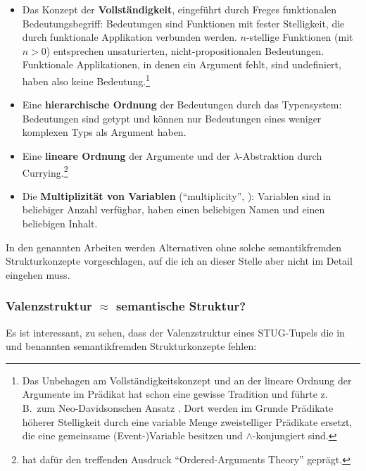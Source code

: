{\begin{itemize}
  \item Das Konzept der {\bf Vollständigkeit}, eingeführt durch Freges funktionalen Bedeutungsbegriff: Bedeutungen sind Funktionen mit fester Stelligkeit, die durch funktionale Applikation verbunden werden. $n$-stellige Funktionen (mit $n > 0$) entsprechen unsaturierten, nicht-propositionalen Bedeutungen. Funktionale Applikationen, in denen ein Argument fehlt, sind undefiniert, haben also keine Bedeutung.\footnote{Das Unbehagen am Vollständigkeitskonzept und an der lineare Ordnung der Argumente im Prädikat hat schon eine gewisse Tradition und führte z.\,B.\ zum Neo-Davidsonschen Ansatz \citep{Parsons:90,Parsons:95}. Dort werden im Grunde Prädikate höherer Stelligkeit durch eine variable Menge zweistelliger Prädikate ersetzt, die eine gemeinsame (Event-)Variable besitzen und $\wedge$-konjungiert sind.}
  \item Eine {\bf hierarchische Ordnung} der Bedeutungen durch das Typensystem: Bedeutungen sind getypt und können nur Bedeutungen eines weniger komplexen Typs als Argument haben.  
  \item Eine {\bf lineare Ordnung} der Argumente und der $\lambda$-Abstraktion durch Currying.\footnote{\cite{Dowty:89} hat dafür den treffenden Ausdruck "`Ordered-Arguments Theory"' geprägt.}
  \item Die {\bf Multiplizität von Variablen} ("`multiplicity"', \citealt{Kracht:07,Kracht:11}): Variablen sind in beliebiger Anzahl verfügbar, haben einen beliebigen Namen und einen beliebigen Inhalt.
\end{itemize}
In den genannten Arbeiten werden Alternativen ohne solche semantikfremden Strukturkonzepte vorgeschlagen, auf die ich an dieser Stelle aber nicht im Detail eingehen muss. 

\subsubsection*{Valenzstruktur $\approx$ semantische Struktur?} 

Es ist interessant, zu sehen, dass der Valenzstruktur eines STUG-Tupels die in \cite{Kracht:07,Kracht:11} und \cite{Erdelyi-Szabo:etal:08} benannten semantikfremden Strukturkonzepte fehlen: 

}
